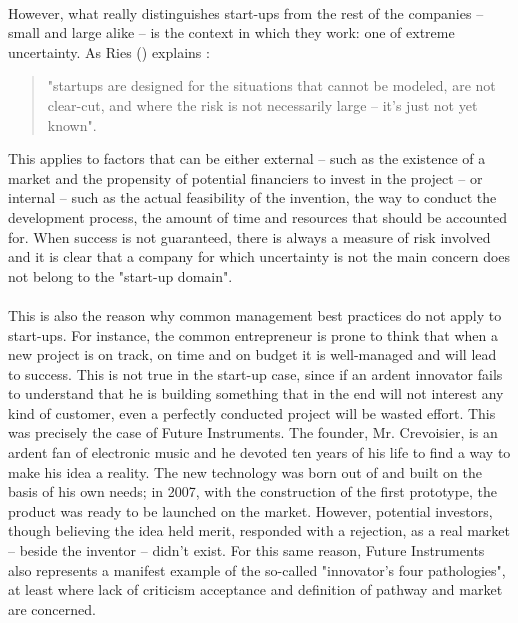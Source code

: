 \documentclass[twoside]{report}
\begin{document}
\paragraph{}
However, what really distinguishes start-ups from the rest of the companies – small and large alike – is the context in which they work: one of extreme uncertainty. As Ries (\cite{ries_what_2010}) explains : \begin{quote}"startups are designed for the situations that cannot be modeled, are not clear-cut, and where the risk is not necessarily large – it's just not yet known".\end{quote} This applies to factors that can be either external – such as the existence of a market and the propensity of potential financiers to invest in the project – or internal – such as the actual feasibility of the invention, the way to conduct the development process, the amount of time and resources that should be accounted for. When success is not guaranteed, there is always a measure of risk involved and it is clear that a company for which uncertainty is not the main concern does not belong to the "start-up domain".
\paragraph{}
This is also the reason why common management best practices do not apply to start-ups. For instance, the common entrepreneur is prone to think that when a new project is on track, on time and on budget it is well-managed and will lead to success. This is not true in the start-up case, since if an ardent innovator fails to understand that he is building something that in the end will not interest any kind of customer, even a perfectly conducted project will be wasted effort. This was precisely the case of Future Instruments. The founder, Mr. Crevoisier, is an ardent fan of electronic music and he devoted ten years of his life to find a way to make his idea a reality. The new technology was born out of and built on the basis of his own needs; in 2007, with the construction of the first prototype, the product was ready to be launched on the market. However, potential investors, though believing the idea held merit, responded with a rejection, as a real market – beside the inventor – didn't exist. For this same reason, Future Instruments also represents a manifest example of the so-called "innovator's four pathologies", at least where lack of criticism acceptance and definition of pathway and market are concerned. 
\end{document}
